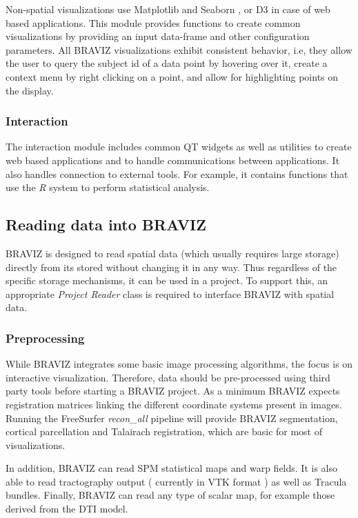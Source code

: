 \documentclass[twocolumn]{svjour3}
\begin{document}
Non-spatial visualizations use Matplotlib \cite{hunter_matplotlib:_2007} and Seaborn \cite{michael_waskom_seaborn:_2015}, or D3  \cite{bostock_d3_2011} in case of web based applications. This module provides functions to create common visualizations by providing an input data-frame and other configuration parameters. All BRAVIZ visualizations exhibit consistent behavior, i.e, they  allow the user to query the subject id of a data point by hovering over it, create a context menu by right clicking on a point, and allow for highlighting points on the display. 

\subsubsection{Interaction}

The interaction module includes common QT widgets as well as utilities to create web based applications and to handle communications between applications. It also handles connection to external tools. For example, it contains functions that use the \emph{R} system to perform statistical analysis. 

\subsection{Reading data into BRAVIZ}

BRAVIZ is designed to read spatial data (which usually requires large storage) directly from its stored without changing it in any way. Thus regardless of the specific storage mechanisms, it can be used in a project. To support this, an appropriate \emph{Project Reader} class is required to interface BRAVIZ with spatial data.

\subsubsection{Preprocessing}

While BRAVIZ integrates some basic image processing algorithms, the focus is on interactive visualization. Therefore,  data should be pre-processed using third party tools before starting a BRAVIZ project. As a minimum BRAVIZ expects registration matrices linking the different coordinate systems present in images. Running the FreeSurfer \emph{recon\_all} pipeline will provide BRAVIZ segmentation, cortical parcellation and Talairach registration, which are basic for most of visualizations. 

In addition, BRAVIZ can read SPM statistical maps and warp fields. It is also able to read tractography output ( currently in VTK format ) as well as Tracula bundles. Finally, BRAVIZ can read any type of scalar map, for example those derived from the DTI model.
\end{document}
